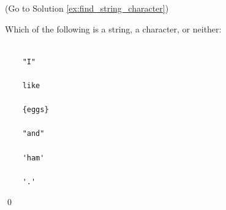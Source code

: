 (Go to Solution \ref{ex:find_string_character})

Which of the following is a string, a character, or neither:

\begin{verbatim}

    "I"      

    like     

    {eggs}   

    "and"    

    'ham'    

    '.'      

\end{verbatim}

\qed

